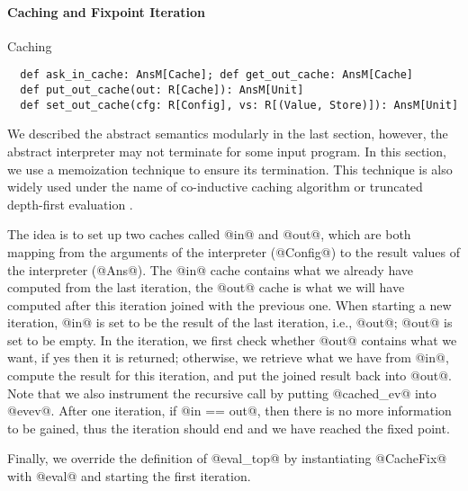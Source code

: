 \paragraph{Caching and Fixpoint Iteration} Caching

\begin{lstlisting}
  def ask_in_cache: AnsM[Cache]; def get_out_cache: AnsM[Cache]
  def put_out_cache(out: R[Cache]): AnsM[Unit]
  def set_out_cache(cfg: R[Config], vs: R[(Value, Store)]): AnsM[Unit]
\end{lstlisting}

We described the abstract semantics modularly in the last section, however, the
abstract interpreter may not terminate for some input program. In this section,
we use a memoization technique to ensure its termination. This technique is also
widely used under the name of co-inductive caching algorithm
\cite{DBLP:journals/pacmpl/DaraisLNH17, Wei:2018:RAA:3243631.3236800} or
truncated depth-first evaluation \cite{Rosendahl:AbsIntPL}.

The idea is to set up two caches called @in@ and @out@, which are both mapping
from the arguments of the interpreter (@Config@) to the result values of the
interpreter (@Ans@). The @in@ cache contains what we already have computed from
the last iteration, the @out@ cache is what we will have computed after this
iteration joined with the previous one. When starting a new iteration, @in@ is
set to be the result of the last iteration, i.e., @out@; @out@ is set to be
empty. In the iteration, we first check whether @out@ contains what we want, if
yes then it is returned; otherwise, we retrieve what we have from @in@, compute
the result for this iteration, and put the joined result back into @out@. Note
that we also instrument the recursive call by putting @cached_ev@ into @evev@.
After one iteration, if @in == out@, then there is no more information to be
gained, thus the iteration should end and we have reached the fixed point.

Finally, we override the definition of @eval_top@ by instantiating @CacheFix@
with @eval@ and starting the first iteration.
